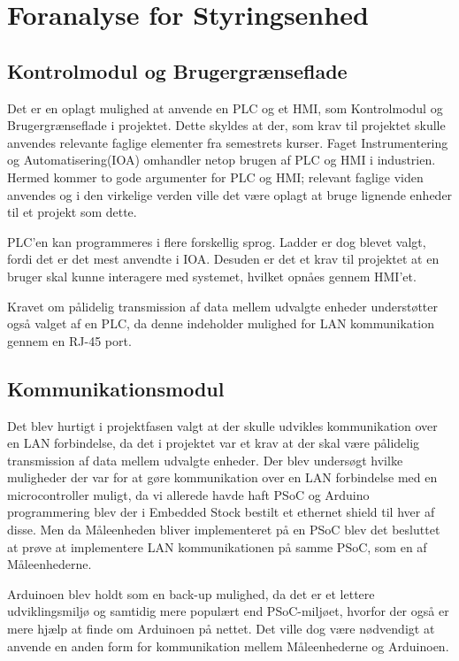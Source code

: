
\section{Foranalyse for Styringsenhed}

\subsection{Kontrolmodul og Brugergrænseflade}
Det er en oplagt mulighed at anvende en PLC og et HMI, som Kontrolmodul og Brugergrænseflade i projektet. Dette skyldes at der, som krav til projektet skulle anvendes relevante faglige elementer fra semestrets kurser. Faget Instrumentering og Automatisering(IOA) omhandler netop brugen af PLC og HMI i industrien. Hermed kommer to gode argumenter for PLC og HMI; relevant faglige viden anvendes og i den virkelige verden ville det være oplagt at bruge lignende enheder til et projekt som dette.


PLC'en kan programmeres i flere forskellig sprog. Ladder er dog blevet valgt, fordi det er det mest anvendte i IOA. Desuden er det et krav til projektet at en bruger skal kunne interagere med systemet, hvilket opnåes gennem HMI'et.


Kravet om pålidelig transmission af data mellem udvalgte enheder understøtter også valget af en PLC, da denne indeholder mulighed for LAN kommunikation gennem en RJ-45 port.

\subsection{Kommunikationsmodul}
Det blev hurtigt i projektfasen valgt at der skulle udvikles kommunikation over en LAN forbindelse, da det i projektet var et krav at der skal være pålidelig transmission af data mellem udvalgte enheder. Der blev undersøgt hvilke muligheder der var for at gøre kommunikation over en LAN forbindelse med en microcontroller muligt, da vi allerede havde haft PSoC og Arduino programmering blev der i Embedded Stock bestilt et ethernet shield til hver af disse. Men da Måleenheden bliver implementeret på en PSoC blev det besluttet at prøve at implementere LAN kommunikationen på samme PSoC, som en af Måleenhederne. 


Arduinoen blev holdt som en back-up mulighed, da det er et lettere udviklingsmiljø og samtidig mere populært end PSoC-miljøet, hvorfor der også er mere hjælp at finde om Arduinoen på nettet. Det ville dog være nødvendigt at anvende en anden form for kommunikation mellem Måleenhederne og Arduinoen. 






